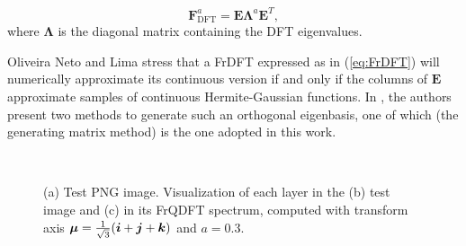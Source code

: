 \begin{equation}
\label{eq:FrDFT}
\mathbf{F}_{\text{DFT}}^a = \mathbf{E} \mathbf{\Lambda}^a \mathbf{E}^T,
\end{equation}
where $ \mathbf{\Lambda} $ is the diagonal matrix containing the DFT eigenvalues.

Oliveira Neto and Lima \cite{de2017discrete} stress that a FrDFT expressed as in (\ref{eq:FrDFT}) will numerically approximate its continuous version if and only if the columns of $ \mathbf{E} $ approximate samples of continuous Hermite-Gaussian functions. In \cite{de2017discrete}, the authors present two methods to generate such an orthogonal eigenbasis, one of which (the generating matrix method) is the one adopted in this work.

\begin{figure}
\centering
\caption{(a) Test PNG image. Visualization of each layer in the (b) test image and (c) in its FrQDFT spectrum, computed with transform axis $ \boldsymbol{\mu} = \frac{1}{\sqrt{3}}(\boldsymbol{i} + \boldsymbol{j} + \boldsymbol{k}) $ and $ a=0{.}3 $.}
~
~
~
\floatsource
\end{figure}

